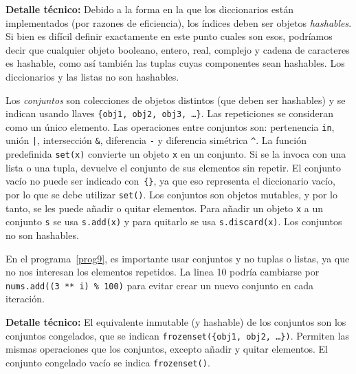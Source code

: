 \documentclass[a4paper, 11pt]{article}
\theoremstyle{plain}
\theoremstyle{definition}
\begin{document}
\bigskip



\bigskip

{\bf Detalle técnico:} Debido a la forma en la que los diccionarios están
implementados (por razones de eficiencia), los índices deben ser objetos
\emph{hashables}. Si bien es difícil definir exactamente en este punto
cuales son esos, podríamos decir que cualquier objeto booleano, entero,
real, complejo y cadena de caracteres es hashable, como así también las
tuplas cuyas componentes sean hashables. Los diccionarios y las listas
no son hashables.

\bigskip

Los \emph{conjuntos} son colecciones de objetos distintos (que deben ser
hashables) y se indican usando llaves \texttt{\{obj1, obj2, obj3, \ldots\}}.
Las repeticiones se consideran como un único elemento. Las operaciones entre
conjuntos son: pertenencia \texttt{in}, unión \texttt{|}, intersección
\texttt{\&}, diferencia \texttt{-} y diferencia simétrica \texttt{\^}.
La función predefinida \texttt{set(x)} convierte un objeto \texttt{x} en
un conjunto. Si se la invoca con una lista o una tupla, devuelve el
conjunto de sus elementos sin repetir.  El conjunto vacío no puede ser
indicado con~\texttt{\{\}}, ya que eso representa el diccionario vacío, por
lo que se debe utilizar \texttt{set()}. Los conjuntos son objetos mutables,
y por lo tanto, se les puede añadir o quitar elementos. Para añadir un
objeto \texttt{x} a un conjunto \texttt{s} se usa \texttt{s.add(x)} y
para quitarlo se usa \texttt{s.discard(x)}. Los conjuntos no son hashables.

\bigskip



\bigskip

En el programa~\ref{prog9}, es importante usar conjuntos y no tuplas o listas,
ya que no nos interesan los elementos repetidos. La linea 10 podría cambiarse
por \texttt{nums.add((3 ** i) \% 100)} para evitar crear un nuevo conjunto en
cada iteración.

\bigskip

{\bf Detalle técnico:} El equivalente inmutable (y hashable) de los conjuntos son
los conjuntos congelados, que se indican \texttt{frozenset(\{obj1, obj2, \ldots\})}.
Permiten las mismas operaciones que los conjuntos, excepto añadir y quitar
elementos. El conjunto congelado vacío se indica \texttt{frozenset()}.
\end{document}

